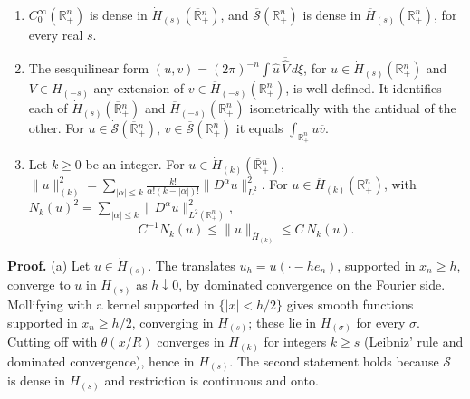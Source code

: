 \documentclass[
  11pt,
]{article}
\begin{document}
\begin{enumerate}
\def\labelenumi{(\alph{enumi})}
\item
  \(C_0^\infty(\mathbb R^n_+)\) is dense in
  \(\dot H_{(s)}(\overline{\mathbb R}{}^n_+)\), and
  \(\overline{\mathcal S}(\mathbb R^n_+)\) is dense in
  \(\overline H_{(s)}(\mathbb R^n_+)\), for every real \(s\).
\item
  The sesquilinear form
  \((u,v)=(2\pi)^{-n}\int\widehat u\,\overline{\widehat V}\,d\xi\), for
  \(u\in\dot H_{(s)}(\overline{\mathbb R}{}^n_+)\) and \(V\in H_{(-s)}\)
  any extension of \(v\in\overline H_{(-s)}(\mathbb R^n_+)\), is well
  defined. It identifies each of
  \(\dot H_{(s)}(\overline{\mathbb R}{}^n_+)\) and
  \(\overline H_{(-s)}(\mathbb R^n_+)\) isometrically with the antidual
  of the other. For
  \(u\in\dot{\mathcal S}(\overline{\mathbb R}{}^n_+)\),
  \(v\in\overline{\mathcal S}(\mathbb R^n_+)\) it equals
  \(\int_{\mathbb R^n_+}u\overline v\).
\item
  Let \(k\geq0\) be an integer. For
  \(u\in\dot H_{(k)}(\overline{\mathbb R}{}^n_+)\),
  \(\|u\|_{(k)}^2=\sum_{|\alpha|\leq k}\frac{k!}{\alpha!(k-|\alpha|)!}\|D^\alpha u\|^2_{L^2}\).
  For \(u\in\overline H_{(k)}(\mathbb R^n_+)\), with
  \(N_k(u)^2=\sum_{|\alpha|\leq k}\|D^\alpha u\|^2_{L^2(\mathbb R^n_+)}\),
  \[
C^{-1}N_k(u)\leq\|u\|_{\overline H_{(k)}}\leq C\,N_k(u).
\tag{10.1}
\]
\end{enumerate}

\textbf{Proof.} (a) Let \(u\in\dot H_{(s)}\). The translates
\(u_h=u(\cdot-he_n)\), supported in \(x_n\geq h\), converge to \(u\) in
\(H_{(s)}\) as \(h\downarrow0\), by dominated convergence on the Fourier
side. Mollifying with a kernel supported in \(\{|x|<h/2\}\) gives smooth
functions supported in \(x_n\geq h/2\), converging in \(H_{(s)}\); these
lie in \(H_{(\sigma)}\) for every \(\sigma\). Cutting off with
\(\theta(x/R)\) converges in \(H_{(k)}\) for integers \(k\geq s\)
(Leibniz' rule and dominated convergence), hence in \(H_{(s)}\). The
second statement holds because \(\mathcal S\) is dense in \(H_{(s)}\)
and restriction is continuous and onto.
\end{document}
